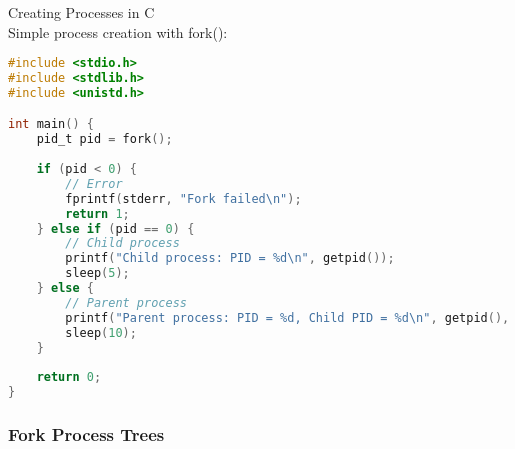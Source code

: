 \begin{example2}{Creating Processes in C}\\
    Simple process creation with fork():
    
\begin{lstlisting}[language=C, style=basesmol]
#include <stdio.h>
#include <stdlib.h>
#include <unistd.h>

int main() {
    pid_t pid = fork();
    
    if (pid < 0) {
        // Error
        fprintf(stderr, "Fork failed\n");
        return 1;
    } else if (pid == 0) {
        // Child process
        printf("Child process: PID = %d\n", getpid());
        sleep(5);
    } else {
        // Parent process
        printf("Parent process: PID = %d, Child PID = %d\n", getpid(), pid);
        sleep(10);
    }
    
    return 0;
}
\end{lstlisting}
\end{example2}

\subsubsection{Fork Process Trees}

